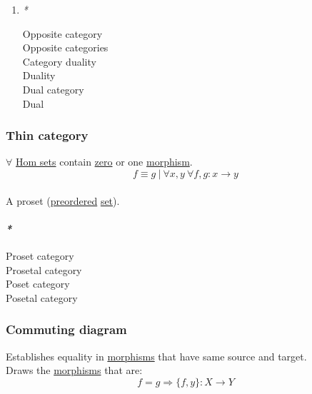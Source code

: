 \documentclass[11pt]{article}
\begin{document}
\begin{enumerate}
\item \emph{*}
\label{sec:org7c1ae2b}

\label{org99d1f00}Opposite category\\
\label{org87fabdc}Opposite categories\\
\label{orga78b2f9}Category duality\\
\label{orgb11fc21}Duality\\
\label{org748401f}Dual category\\
\label{org28cefbe}Dual\\
\end{enumerate}

\subsubsection{\label{orga08d923}Thin category}
\label{sec:orgb54a380}
\(\forall\) \hyperref[org5b9cf9b]{Hom sets} contain \hyperref[org5d1963a]{zero} or one \hyperref[org5de09d4]{morphism}.\\

$$ f \equiv g \ | \ \forall x,y \ \forall f,g: x \to y $$\\

A proset (\hyperref[org011c8d7]{preordered} \hyperref[org1faf06d]{set}).\\

\paragraph{\emph{*}}
\label{sec:org284ece1}

\label{orgcad50d2}Proset category\\
\label{orgf182f7c}Prosetal category\\
\label{org0d2ecef}Poset category\\
\label{orgd78691f}Posetal category\\

\subsubsection{\label{orged0a20d}Commuting diagram}
\label{sec:orgb5461ac}
Establishes equality in \hyperref[org6c2fa5c]{morphisms} that have same source and target.\\

Draws the \hyperref[org6c2fa5c]{morphisms} that are:\\
$$ f = g \Rightarrow \{f, y\}: X \to Y $$\\
\end{document}
